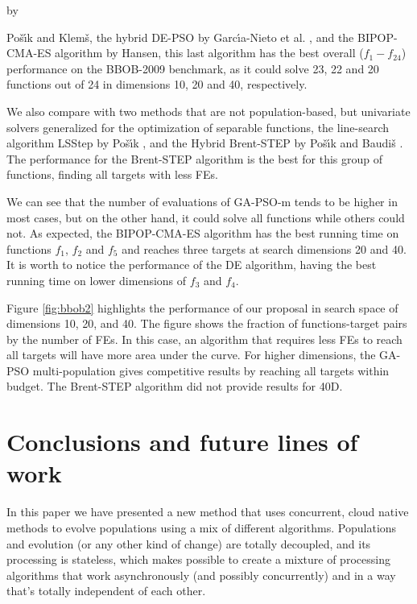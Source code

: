 \documentclass[runningheads]{llncs}
\begin{document}
by {Po{\v{s}}{\'\i}k and Klem{\v{s}},
the hybrid DE-PSO by Garc{\'\i}a-Nieto et
al. \cite{garcia2009noiseless}, %
and the BIPOP-CMA-ES algorithm \cite{hansen2009benchmarking} by Hansen, this last algorithm has the
best overall ($f_1-f_24$) performance on the BBOB-2009 benchmark,
as it  could solve 23, 22 and 20 functions out of 24 in dimensions 10, 20 and
40, respectively. %

We also compare with two methods that are not population-based, but univariate
solvers generalized for the optimization of separable functions, the
line-search algorithm LSStep by Po{\v{s}}{\'\i}k \cite{povsik2009bbob}, and the Hybrid Brent-STEP by
Po{\v{s}}{\'\i}k and Baudi{\v{s}} \cite{povsik2015dimension}. The performance for the Brent-STEP algorithm
is the best for this group of functions, finding all targets with less FEs.

We can see that the number of evaluations of {\sf GA-PSO-m} tends to be higher
in most cases, but on the other hand, it could solve all functions
while others could not. %
As expected, the BIPOP-CMA-ES algorithm has the best running time on functions
$f_1$, $f_2$ and $f_5$ and reaches three targets at search dimensions 20 and 40.
It is worth to notice the performance of the DE algorithm, having the best
running time on lower dimensions of  $f_3$ and $f_4$.

Figure \ref{fig:bbob2} highlights the performance of our proposal in search
space of dimensions 10, 20, and 40. The figure shows the fraction of
functions-target pairs by the number of FEs. In this case, an algorithm that
requires less FEs to reach all targets will have more area under the curve. For
higher dimensions, the GA-PSO multi-population gives competitive results by
reaching all targets within budget. The Brent-STEP algorithm did not provide
results for 40D.


\section{Conclusions and future lines of work}
\label{conclusions}

In this paper we have presented a new method that uses concurrent,
cloud native methods to evolve populations using a mix of different algorithms. Populations and evolution (or any other kind of
change) are totally decoupled, and its processing is stateless, which
makes possible to create a mixture of processing algorithms that work
asynchronously (and possibly concurrently) and in a way that's totally
independent of each other. %

}
\end{document}

